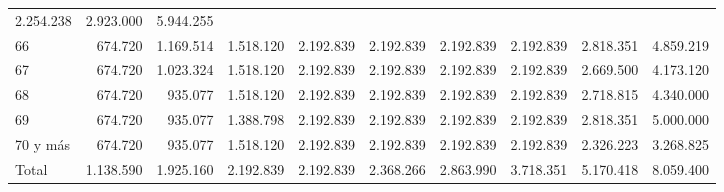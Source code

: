 \begin{tabular}{llllllllll}
  \multicolumn{1}{r}{2.254.238} &
  \multicolumn{1}{r}{2.923.000} &
  \multicolumn{1}{r}{5.944.255} \\
\multicolumn{1}{l}{\hspace{1em}66} &
  \multicolumn{1}{|r}{674.720} &
  \multicolumn{1}{r}{1.169.514} &
  \multicolumn{1}{r}{1.518.120} &
  \multicolumn{1}{r}{2.192.839} &
  \multicolumn{1}{r}{2.192.839} &
  \multicolumn{1}{r}{2.192.839} &
  \multicolumn{1}{r}{2.192.839} &
  \multicolumn{1}{r}{2.818.351} &
  \multicolumn{1}{r}{4.859.219} \\
\multicolumn{1}{l}{\hspace{1em}67} &
  \multicolumn{1}{|r}{674.720} &
  \multicolumn{1}{r}{1.023.324} &
  \multicolumn{1}{r}{1.518.120} &
  \multicolumn{1}{r}{2.192.839} &
  \multicolumn{1}{r}{2.192.839} &
  \multicolumn{1}{r}{2.192.839} &
  \multicolumn{1}{r}{2.192.839} &
  \multicolumn{1}{r}{2.669.500} &
  \multicolumn{1}{r}{4.173.120} \\
\multicolumn{1}{l}{\hspace{1em}68} &
  \multicolumn{1}{|r}{674.720} &
  \multicolumn{1}{r}{935.077} &
  \multicolumn{1}{r}{1.518.120} &
  \multicolumn{1}{r}{2.192.839} &
  \multicolumn{1}{r}{2.192.839} &
  \multicolumn{1}{r}{2.192.839} &
  \multicolumn{1}{r}{2.192.839} &
  \multicolumn{1}{r}{2.718.815} &
  \multicolumn{1}{r}{4.340.000} \\
\multicolumn{1}{l}{\hspace{1em}69} &
  \multicolumn{1}{|r}{674.720} &
  \multicolumn{1}{r}{935.077} &
  \multicolumn{1}{r}{1.388.798} &
  \multicolumn{1}{r}{2.192.839} &
  \multicolumn{1}{r}{2.192.839} &
  \multicolumn{1}{r}{2.192.839} &
  \multicolumn{1}{r}{2.192.839} &
  \multicolumn{1}{r}{2.818.351} &
  \multicolumn{1}{r}{5.000.000} \\
\multicolumn{1}{l}{\hspace{1em}70 y más} &
  \multicolumn{1}{|r}{674.720} &
  \multicolumn{1}{r}{935.077} &
  \multicolumn{1}{r}{1.518.120} &
  \multicolumn{1}{r}{2.192.839} &
  \multicolumn{1}{r}{2.192.839} &
  \multicolumn{1}{r}{2.192.839} &
  \multicolumn{1}{r}{2.192.839} &
  \multicolumn{1}{r}{2.326.223} &
  \multicolumn{1}{r}{3.268.825} \\
\multicolumn{1}{l}{\hspace{1em}Total} &
  \multicolumn{1}{|r}{1.138.590} &
  \multicolumn{1}{r}{1.925.160} &
  \multicolumn{1}{r}{2.192.839} &
  \multicolumn{1}{r}{2.192.839} &
  \multicolumn{1}{r}{2.368.266} &
  \multicolumn{1}{r}{2.863.990} &
  \multicolumn{1}{r}{3.718.351} &
  \multicolumn{1}{r}{5.170.418} &
  \multicolumn{1}{r}{8.059.400} \\
\cline{1-10}
\end{tabular}
